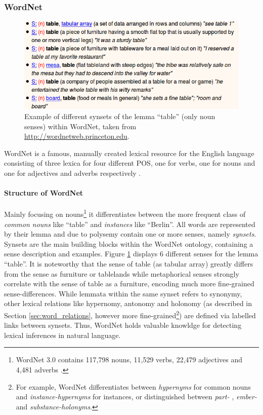 \subsubsection{WordNet}
\begin{figure}
\centering
	\includegraphics[totalheight=3.5cm]{fig/wordnet_example.png}
	\caption{Example of different synsets of the lemma ``table'' (only noun senses) within WordNet, taken from \href{http://wordnetweb.princeton.edu}{http://wordnetweb.princeton.edu}.}
	\label{fig:wordnet}
\end{figure}
WordNet \citep{miller1995wordnet} is a famous, manually created lexical resource for the English language consisting of three lexica for four different \ac{POS}, one for verbs, one for nouns and one for adjectives and adverbs respectively \citep{Jurafsky2008May}. 
\paragraph*{Structure of WordNet} 
Mainly focusing on nouns\footnote{WordNet 3.0 contains 117,798 nouns, 11,529 verbs, 22,479 adjectives and 4,481 adverbs \citep{Jurafsky2008May}.} it differentiates between the more frequent class of \textit{common nouns} like ``table'' and \textit{instances} like ``Berlin''. All words are represented by their lemma and due to polysemy contain one or more senses, namely \textit{synsets}. Synsets are the main building blocks within the WordNet ontology, containing a sense description and examples. Figure \ref{fig:wordnet} displays 6 different senses for the lemma ``table''. It is noteworthy that the sense of table (as tabular array) greatly differs from the sense as furniture or tablelands while metaphorical senses strongly correlate with the sense of table as a furniture, encoding much more fine-grained sense-differences. While lemmata within the same synset refers to synonymy, other lexical relations like hypernomy, antonomy and holonomy (as described in Section \ref{sec:word_relations}, however more fine-grained\footnote{For example,  WordNet differentiates between \textit{hypernyms} for common nouns and \textit{instance-hypernyms} for instances, or distinguished between \textit{part- }, \textit{ember-} and \textit{substance-holonyms}.}) are defined via labelled links between synsets. Thus, WordNet holds valuable knowldge for detecting lexical inferences in natural language.

